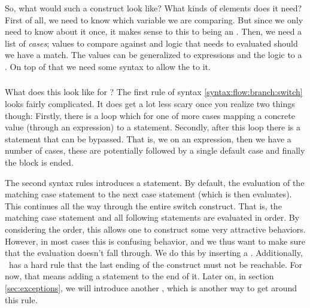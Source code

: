 So, what would such a construct look like? What kinds of elements does it need? First of all, we need to know which variable we are comparing. But since we only need to know about it once, it makes sense to  this to being an . Then, we need a list of \textsl{cases}; values to compare against and logic that needs to evaluated should we have a match. The values can be generalized to expressions and the logic to a . On top of that we need some syntax to allow the  to  it.

\subsubsection{\csharp}
\label{sec:flow:branch:switch:cs}

What does this look like for \csharp? The first rule of syntax \ref{syntax:flow:branch:switch} looks fairly complicated. It does get a lot less scary once you realize two things though: Firstly, there is a loop which for one of more cases mapping a concrete value (through an expression) to a statement. Secondly, after this loop there is a  statement that can be bypassed. That is, we  on an expression, then we have a number of cases, these are potentially followed by a single default case and finally the  block is ended.

\begin{syntaxfloat}
  
  \caption{Statements for  statements}
  \label{syntax:flow:branch:switch}
\end{syntaxfloat}

The second syntax rules introduces a  statement. By default, the evaluation of the matching case statement  to the next case statement (which is then evaluates). This continues all the way through the entire switch construct. That is, the matching case statement and all following statements are evaluated in order. By considering the order, this allows one to construct some very attractive behaviors. However, in most cases this is confusing behavior, and we thus want to make sure that the evaluation doesn't fall through. We do this by inserting a . Additionally, \csharp\ has a hard rule that the last ending  of the  construct must not be reachable. For now, that means adding a  statement to the end of it. Later on, in section \ref{sec:exceptions}, we will introduce another , which is another way to get around this rule.

